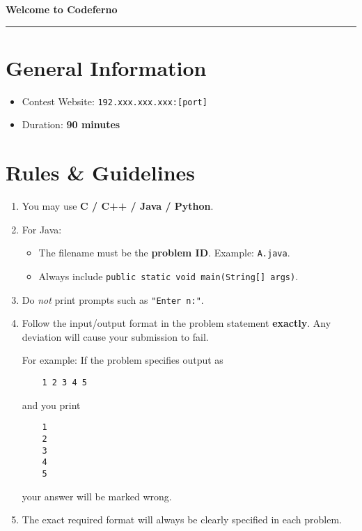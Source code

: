 \documentclass[12pt,a4paper]{article}
\begin{document}
\ifdefined\BOOKLET
  \pagestyle{empty}
\fi

\begin{center}
    {\LARGE \textbf{Welcome to Codeferno}} \\[0.5em]
    \rule{\textwidth}{0.4pt}
\end{center}

\vspace{1em}

\section*{General Information}
\begin{itemize}[leftmargin=1.5em]
    \item Contest Website: \texttt{192.xxx.xxx.xxx:[port]}  
    \item Duration: \textbf{90 minutes}
\end{itemize}

\section*{Rules \& Guidelines}
\begin{enumerate}[leftmargin=1.5em]
    \item You may use \textbf{C / C++ / Java / Python}.
    \item For Java: 
    \begin{itemize}
        \item The filename must be the \textbf{problem ID}. Example: \texttt{A.java}.
        \item Always include \texttt{public static void main(String[] args)}.
    \end{itemize}
    \item Do \emph{not} print prompts such as \texttt{"Enter n:"}.
    \item Follow the input/output format in the problem statement \textbf{exactly}.  
    Any deviation will cause your submission to fail.  
    \begin{tcolorbox}[mybox]
    For example: If the problem specifies output as  
    \begin{verbatim}
    1 2 3 4 5
    \end{verbatim}  
    and you print  
    \begin{verbatim}
    1
    2
    3
    4
    5
    \end{verbatim}  
    your answer will be marked wrong.
    \end{tcolorbox}
    \item The exact required format will always be clearly specified in each problem.
\end{enumerate}
\end{document}
